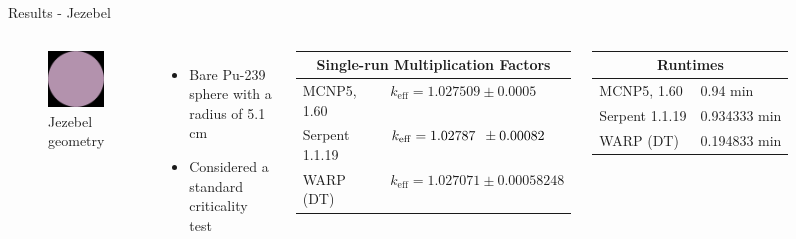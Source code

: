 \documentclass[xcolor=x11names, compress]{beamer}
\renewcommand{\(}{\begin{columns}}
\renewcommand{\)}{\end{columns}}
\newcommand{\<}[1]{\begin{column}{#1}}
\renewcommand{\>}{\end{column}}
\begin{document}
\begin{frame}{Results - Jezebel}
\begin{columns}
	\begin{figure}[h!]
	\includegraphics[width=1.5in]{../figs/jezebel.png}
	\caption*{Jezebel geometry \label{jezebel}}
	\end{figure}
	\begin{itemize}
	\item{Bare Pu-239 sphere with a radius of 5.1 cm}
	\item{Considered a standard criticality test \cite{nea1995}}
	\end{itemize}
	\begin{table}[h]
	\begin{tabular}{ll}
	\multicolumn{2}{c}{Single-run Multiplication Factors} \\ \hline
	MCNP5, 1.60 & $k_{\mathrm{eff}} = 1.027509 \pm 0.0005$ \\
	Serpent 1.1.19 & $k_{\mathrm{eff}} = 1.02787\hspace*{0.5em}\pm 0.00082$ \\
	WARP (DT) & $k_{\mathrm{eff}} = 1.027071 \pm 0.00058248$
	\end{tabular}
	\end{table}
	\begin{table}[h]
	\begin{tabular}{ll}
	\multicolumn{2}{c}{Runtimes} \\ \hline
	MCNP5, 1.60 & 0.94 min \\
	Serpent 1.1.19 & 0.934333 min \\
	WARP (DT) & 0.194833 min %
	\end{tabular}
	\end{table}
\end{columns}
\end{frame}
\end{document}

